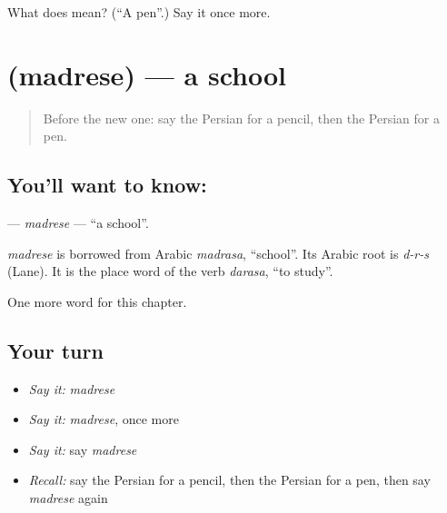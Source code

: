 \begin{tcolorbox}[breakable,colback=teal!4,colframe=teal!35!black,title={Before you move on}]
What does  mean? (\textquotedblleft{}A pen\textquotedblright{}.) Say it once more.
\end{tcolorbox}
\section[\texorpdfstring{\fa{مدرسه} (madrese)}{مدرسه (madrese)}]{ (madrese) — a school}

\label{lesson:FA-C49-madrese}



\begin{quote}
Before the new one: say the Persian for a pencil, then the Persian for a pen.
\end{quote}

\subsection*{You'll want to know: }
\textbf{} — \emph{madrese} — \textquotedblleft{}a school\textquotedblright{}.

\begin{cousinweb}
\emph{madrese} is borrowed from Arabic \emph{madrasa}, \textquotedblleft{}school\textquotedblright{}. Its Arabic root is \emph{d-r-s} (Lane). It is the place word of the verb \emph{darasa}, \textquotedblleft{}to study\textquotedblright{}.
\end{cousinweb}

\begin{grammarlens}[title={What you've built}]
One more word for this chapter.
\end{grammarlens}

\subsection*{Your turn}
\begin{itemize}
\raggedright
  \item \emph{Say it:} \emph{madrese}
  \item \emph{Say it:} \emph{madrese}, once more
  \item \emph{Say it:} say \emph{madrese}
  \item \emph{Recall:} say the Persian for a pencil, then the Persian for a pen, then say \emph{madrese} again
\end{itemize}


